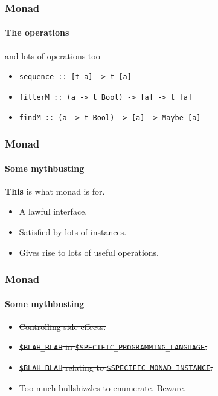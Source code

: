 \begin{frame}[fragile]
\frametitle{Monad}
\framesubtitle{The operations}
\begin{block}{and lots of operations too}
\begin{itemize}
\item \lstinline{sequence :: [t a] -> t [a]}
\item \lstinline{filterM :: (a -> t Bool) -> [a] -> t [a]}
\item \lstinline{findM :: (a -> t Bool) -> [a] -> Maybe [a]}
\end{itemize}
\end{block}
\end{frame}

\begin{frame}[fragile]
\frametitle{Monad}
\framesubtitle{Some mythbusting}
\begin{center}
\textbf{This} is what monad is for.
\end{center}
\begin{center}
\begin{itemize}
\item A lawful interface.
\item Satisfied by lots of instances.
\item Gives rise to lots of useful operations.
\end{itemize}
\end{center}
\end{frame}

\begin{frame}[fragile]
\frametitle{Monad}
\framesubtitle{Some mythbusting}
\begin{itemize}
\item<1-> \sout{Controlling side-effects.}
\item<2-> \sout{\lstinline{$BLAH_BLAH} in \lstinline{$SPECIFIC_PROGRAMMING_LANGUAGE}.}
\item<3-> \sout{\lstinline{$BLAH_BLAH} relating to \lstinline{$SPECIFIC_MONAD_INSTANCE}.}
\item<4-> Too much bullshizzles to enumerate. Beware.
\end{itemize}
\end{frame}
